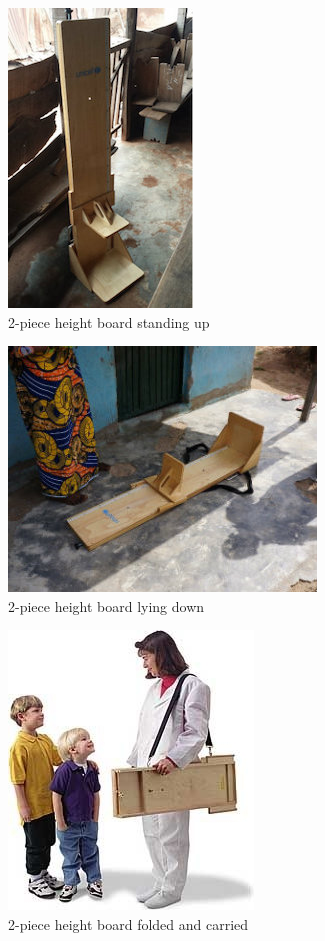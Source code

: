 \documentclass[12pt,]{book}
\theoremstyle{definition}
\theoremstyle{definition}
\theoremstyle{definition}
\theoremstyle{remark}
\begin{document}
\begin{figure}

{\centering \includegraphics{images/heightBoard01} 

}

\caption{2-piece height board standing up}\label{fig:height01}
\end{figure}

\begin{figure}

{\centering \includegraphics{images/heightBoard02} 

}

\caption{2-piece height board lying down}\label{fig:height02}
\end{figure}

\begin{figure}

{\centering \includegraphics{images/shorrBrdcarry} 

}

\caption{2-piece height board folded and carried}\label{fig:height03}
\end{figure}
\end{document}
